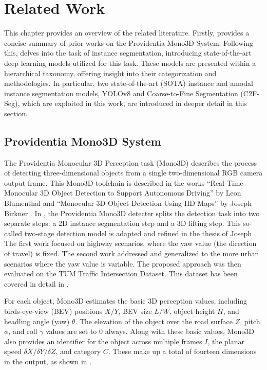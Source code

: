 \chapter{Related Work}  \label{chap:three}%

This chapter provides an overview of the related literature. Firstly,  provides a concise summary of prior works on the Providentia Mono3D System. Following this,  delves into the task of instance segmentation, introducing state-of-the-art deep learning models utilized for this task. These models are presented within a hierarchical taxonomy, offering insight into their categorization and methodologies. In particular, two state-of-the-art (SOTA) instance and amodal instance segmentation models, YOLOv8 and Coarse-to-Fine Segmentation (C2F-Seg), which are exploited in this work, are introduced in deeper detail in this section. 

\section{Providentia Mono3D System}  \label{sec:mono3d}

The Providentia Monocular 3D Perception task (Mono3D) describes the process of detecting three-dimensional objects from a single two-dimensional RGB camera output frame. This Mono3D toolchain is described in the works “Real-Time Monocular 3D Object Detection to Support Autonomous Driving” by Leon Blumenthal \cite{thesisLeon} and “Monocular 3D Object Detection Using HD Maps” by Joseph Birkner \cite{thesisJoseph}. In \cite{thesisLeon}, the Providentia Mono3D detecter splits the detection task into two separate steps: a 2D instance segmentation step and a 3D lifting step. This so-called two-stage detection model is adapted and refined in the thesis of Joseph  \cite{thesisJoseph}. The first work focused on highway scenarios, where the yaw value (the direction of travel) is fixed. The second work addressed and generalized to the more urban scenarios where the yaw value is variable. The proposed approach was then evaluated on the TUM Traffic Intersection Dataset. This dataset has been covered in detail in . 

For each object, Mono3D estimates the basic 3D perception values, including birds-eye-view (BEV) positions $X/Y$, BEV size $L/W$, object height $H$, and headling angle (yaw) $\theta$. The elevation of the object over the road surface $Z$, pitch $\phi$, and roll $\gamma$ values are set to 0 always. Along with these basic values, Mono3D also provides an identifier for the object across multiple frames $I$,  the planar speed $\delta$$X/$$\delta$$Y/$$\delta$$Z$, and category $C$. These make up a total of fourteen dimensions in the output, as shown in . 

